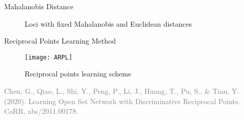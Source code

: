 \begin{frame}{Mahalanobis Distance}
\begin{minipage}{0.49\textwidth}
\begin{figure}[h]
{
              }
              \caption*{\footnotesize{  Loci with fixed Mahalanobis and Euclidean distances}} %
          \end{figure}
  \end{minipage}
\end{frame}

\begin{frame}{Reciprocal Points Learning Method}
  \begin{figure}
      \centering
      \texttt{[image: ARPL]}
      \caption*{Reciprocal points learning scheme}
  \end{figure}
  \begin{flushright}
    \tiny{\textcolor{gray}{Chen, G., Qiao, L., Shi, Y., Peng, P., Li, J., Huang, T., Pu, S., \& Tian, Y. (2020). Learning Open Set Network with Discriminative Reciprocal Points. CoRR, abs/2011.00178. }}
  \end{flushright}
\end{frame}

